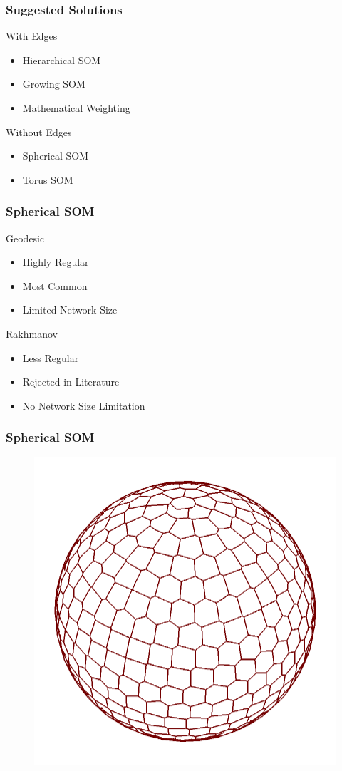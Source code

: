 \documentclass[nototal,handout]{beamer}
\begin{document}
\begin{frame}
	\frametitle{Suggested Solutions}
 
\begin{block}{With Edges}
 \begin{itemize}
 \item  Hierarchical SOM
 \item  Growing SOM
 \item  Mathematical Weighting
 \end{itemize}
 \end{block} 
\begin{block}{Without Edges}
 \begin{itemize}
 \item  Spherical SOM
 \item  Torus SOM
 \end{itemize}
 \end{block} \end{frame} 

\begin{frame}
	\frametitle{Spherical SOM}
 
\begin{block}{Geodesic}
 \begin{itemize}
 \item  Highly Regular
 \item  Most Common
 \item  Limited Network Size
 \end{itemize}
 \end{block} 
\begin{block}{Rakhmanov}
 \begin{itemize}
 \item  Less Regular
 \item  Rejected in Literature
 \item  No Network Size Limitation
 \end{itemize}
 \end{block} \end{frame} 

\begin{frame}
	\frametitle{Spherical SOM}
  \begin{center}
  \begin{figure}
  \includegraphics[width=0.60\linewidth]{642.png}
  \end{figure}
  \end{center}
 \end{frame} 
\end{document}
